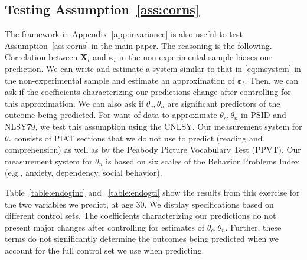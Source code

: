 \subsection{Testing  Assumption~\ref{ass:corns}} \label{app:endogeneity}

\noindent The framework in Appendix~\ref{app:invariance} is also useful to test Assumption~\ref{ass:corns} in the main paper. The reasoning is the following. Correlation between $\bm{X}_{t}$ and $\bm{\varepsilon}_{t}$ in the non-experimental sample biases our prediction. We can write and estimate a system similar to that in \eqref{eq:msystem} in the non-experimental sample and estimate an approximation of $\bm{\varepsilon}_{t}$. Then, we can ask if the coefficients characterizing our predictions change after controlling for this approximation. We can also ask if $\theta_{c}, \theta_{n}$ are significant predictors of the outcome being predicted. For want of data to approximate $\theta_{c}, \theta_{n}$ in PSID and NLSY79, we test this assumption using the CNLSY. Our measurement system for $\theta_{c}$ consists of PIAT sections that we do not use to predict (reading and comprehension) as well as by the Peabody Picture Vocabulary Test (PPVT). Our measurement system for $\theta_{n}$ is based on six scales of the Behavior Problems Index (e.g., anxiety, dependency, social behavior).

Table~\ref{table:endoginc} and ~\ref{table:endogti} show the results from this exercise for the two variables we predict, at age 30. We display specifications based on different control sets. The coefficients characterizing our predictions do not present major changes after controlling for estimates of $\theta_{c}, \theta_{n}$. Further, these terms do not significantly determine the outcomes being predicted when we account for the full control set we use when predicting.

